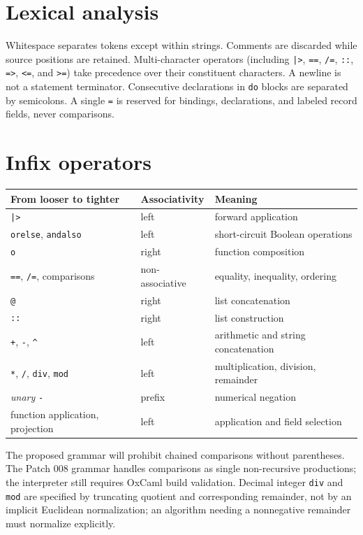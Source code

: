 \documentclass[11pt,oneside,openany]{book}
\newcommand{\kw}[1]{\texttt{#1}}
\begin{document}
\section{Lexical analysis}
Whitespace separates tokens except within strings. Comments are discarded while source positions are retained. Multi-character operators (including \kw{|>}, \kw{==}, \kw{/=}, \kw{::}, \kw{=>}, \kw{<=}, and \kw{>=}) take precedence over their constituent characters. A newline is not a statement terminator. Consecutive declarations in \kw{do} blocks are separated by semicolons. A single \kw{=} is reserved for bindings, declarations, and labeled record fields, never comparisons.

\section{Infix operators}
\begin{center}
\small
\begin{tabularx}{\linewidth}{@{}l l X@{}}
\toprule
From looser to tighter & Associativity & Meaning \\
\midrule
\kw{|>} & left & forward application \\
\kw{orelse}, \kw{andalso} & left & short-circuit Boolean operations \\
\kw{o} & right & function composition \\
\kw{==}, \kw{/=}, comparisons & non-associative & equality, inequality, ordering \\
\kw{@} & right & list concatenation \\
\kw{::} & right & list construction \\
\kw{+}, \kw{-}, \kw{\^} & left & arithmetic and string concatenation \\
\kw{*}, \kw{/}, \kw{div}, \kw{mod} & left & multiplication, division, remainder \\
\emph{unary} \kw{-} & prefix & numerical negation \\
function application, projection & left & application and field selection \\
\bottomrule
\end{tabularx}
\end{center}
The proposed grammar will prohibit chained comparisons without parentheses. The Patch 008 grammar handles comparisons as single non-recursive productions; the interpreter still requires OxCaml build validation. Decimal integer \kw{div} and \kw{mod} are specified by truncating quotient and corresponding remainder, not by an implicit Euclidean normalization; an algorithm needing a nonnegative remainder must normalize explicitly.
\end{document}
